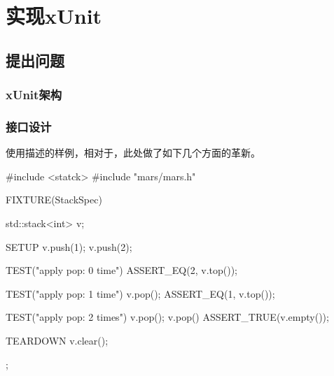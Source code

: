 \begin{savequote}[45mm]
\end{savequote}

\chapter{实现xUnit} 
\label{ch:ice-breaker}

\begin{content}

\end{content}

\section{提出问题}
	
\begin{content}

\subsection{xUnit架构}

\subsection{接口设计}

使用描述的样例，相对于，此处做了如下几个方面的革新。

\begin{enum}
\end{enum}


\begin{leftbar}
 \begin{c++}
#include <statck>
#include "mars/mars.h"

FIXTURE(StackSpec) {
  std::stack<int> v;   

  SETUP {
    v.push(1);
    v.push(2);
  }

  TEST("apply pop: 0 time") {
    ASSERT_EQ(2, v.top());
  }

  TEST("apply pop: 1 time") {
    v.pop();
    ASSERT_EQ(1, v.top());
  }

  TEST("apply pop: 2 times") {
    v.pop();
    v.pop()
    ASSERT_TRUE(v.empty());
  }
 
  TEARDOWN {
    v.clear();
  }
}; 
 \end{c++}
\end{leftbar}

\end{content}

